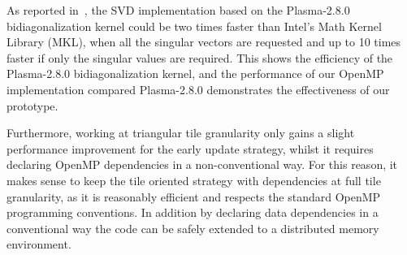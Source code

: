 As reported in~\cite{haidar2013improved},
the SVD implementation based on the
Plasma-2.8.0 bidiagonalization kernel could be two times faster than
Intel’s Math Kernel Library (MKL), when all the singular vectors are
requested and up to 10 times faster if only the singular values are
required. This shows the efficiency of the Plasma-2.8.0 bidiagonalization
kernel, and the performance of our OpenMP implementation
compared Plasma-2.8.0 demonstrates the effectiveness of our prototype.

Furthermore, working at triangular tile granularity only gains
a slight performance improvement for the early update
strategy,
whilst it requires declaring OpenMP dependencies in a
non-conventional way.
For this reason, it makes sense to keep the tile
oriented strategy with dependencies at full tile granularity,
as it is reasonably efficient and respects the standard OpenMP programming
conventions.
In addition by declaring data dependencies in a conventional
way the code can be safely extended to a distributed memory environment.
